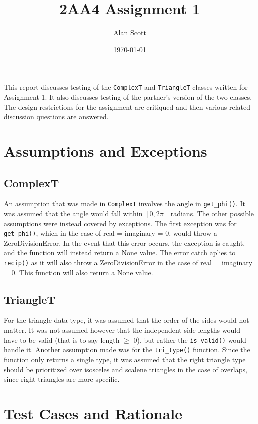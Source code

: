 \documentclass[12pt]{article}
\title{2AA4 Assignment 1}
\author{Alan Scott}
\date{\today}
\begin{document}
\maketitle

This report discusses testing of the \verb|ComplexT| and \verb|TriangleT|
classes written for Assignment 1. It also discusses testing of the partner's
version of the two classes. The design restrictions for the assignment
are critiqued and then various related discussion questions are answered.

\section{Assumptions and Exceptions} \label{AssumptAndExcept}
\subsection*{ComplexT}
An assumption that was made in \verb|ComplexT| involves the angle in \verb|get_phi()|. It was assumed that the angle would fall within $[0,2\pi]$ radians. The other possible assumptions were instead covered by exceptions. The first exception was for \verb|get_phi()|, which in the case of real = imaginary = 0, would throw a ZeroDivisionError. In the event that this error occurs, the exception is caught, and the function will instead return a None value. The error catch aplies to \verb|recip()| as it will also throw a ZeroDivisionError in the case of real = imaginary = 0. This function will also return a None value. 

\subsection*{TriangleT}
For the triangle data type, it was assumed that the order of the sides would not matter. It was not assumed however that the independent side lengths would have to be valid (that is to say length $\geq$ 0), but rather the \verb|is_valid()| would handle it. Another assumption made was for the \verb|tri_type()| function. Since the function only returns a single type, it was assumed that the right triangle type should be prioritized over isosceles and scalene triangles in the case of overlaps, since right triangles are more specific. 

\section{Test Cases and Rationale} \label{Testing}
\end{document}

